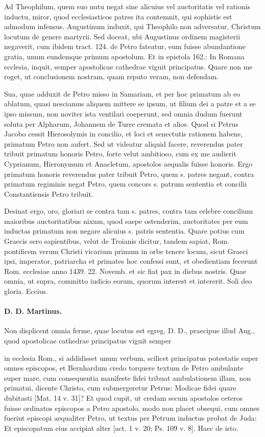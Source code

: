 Ad Theophilum, quem suo nutu negat sine alicuius vel auctoritatis vel rationis inductu, miror, quod ecclesiasticos patres ita contemnit, qui sophistis est admodum infensus. Augustinum induxit, qui Theophilo non adversatur, Christum locutum de genere martyrii. Sed doceat, ubi Augustinus ordinem magisterii negaverit, cum ibidem tract. 124. de Petro fateatur, eum fuisse abundantione gratia, unum eundemque primum apostolum. Et in epistola 162.: In Romana ecclesia, inquit, semper apostolicae cathedrae viguit principatus. Quare non me roget, ut conclusionem nostram, quam reputo veram, non defendam.

Sua, quae adduxit de Petro misso in Samariam, et per hoc primatum ab eo ablatum, quasi nesciamus aliquem mittere se ipsum, ut filium dei a patre et a se ipso missum, non noviter ista ventilari coeperunt, sed omnia dudum fuerunt soluta per Alpharum, Johannem de Turre cremata et alios. Quod si Petrus Jacobo cessit Hierosolymis in concilio, et loci et senectutis rationem habens, primatum Petro non aufert. Sed ut videatur aliquid facere, reverendus pater tribuit primatum honoris Petro, forte velut ambitioso, cum ex me audierit Cyprianum, Hieronymum et Anacletum, apostolos aequalis fuisse honoris. Ergo primatum honoris reverendus pater tribuit Petro, quem s. patres negant, contra primatum regiminis negat Petro, quem concors s. patrum sententia et concilii Constantiensis Petro tribuit.

Desinat ergo, oro, gloriari se contra tam s. patres, contra tam celebre concilium maioribus auctoritatibus nixum, quod saepe ostenderim, auctoritates per eum inductas primatum non negare alicuius s. patris sententia. Quare potius cum Graecis sero sapientibus, velut de Troianis dicitur, tandem sapiat, Rom. pontificem verum Christi vicarium primum in orbe tenere locum, sicut Graeci ipsi, imperator, patriarcha et primates hoc confessi sunt, et obedientiam fecerunt Rom. ecclesiae anno 1439. 22. Novemb. et sic fiat pax in diebus nostris. Quae omnia, ut supra, committo iudicio eorum, quorum interest et intererit. Soli deo gloria. Eccius.

\marginpar{\small[322]}
\paragraph*{D. D. Martinus.}

Non displicent omnia ferme, quae locutus est egreg. D. D., praecipue illud Aug., quod apostolicae cathedrae principatus viguit semper

in ecclesia Rom., si addidisset unum verbum, scilicet principatus potestatis super omnes episcopos, et Bernhardum credo torquere textum de Petro ambulante super mare, cum consequentia manifeste fidei tribuat ambulationem illam, non primatui, dicente Christo, cum submergeretur Petrus: Modicae fidei quare dubitasti [Mat. 14 v. 31]? Et quod cupit, ut credam secum apostolos ceteros fuisse ordinatos episcopos a Petro apostolo, modo non placet obsequi, cum omnes fuerint episcopi aequaliter Petro, ut textus per Petrum inductus probat de Juda: Et episcopatum eius accipiat alter [act. 1 v. 20; Ps. 109 v. 8]. Haec de isto.

